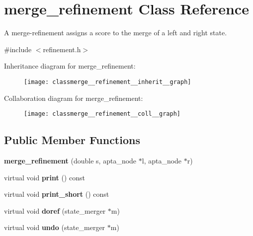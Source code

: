 \hypertarget{classmerge__refinement}{}\section{merge\+\_\+refinement Class Reference}
\label{classmerge__refinement}


A merge-\/refinement assigns a score to the merge of a left and right state.  




{\ttfamily \#include $<$refinement.\+h$>$}



Inheritance diagram for merge\+\_\+refinement\+:
\nopagebreak
\begin{figure}[H]
\begin{center}
\leavevmode
\texttt{[image: classmerge\_\_refinement\_\_inherit\_\_graph]}
\end{center}
\end{figure}


Collaboration diagram for merge\+\_\+refinement\+:
\nopagebreak
\begin{figure}[H]
\begin{center}
\leavevmode
\texttt{[image: classmerge\_\_refinement\_\_coll\_\_graph]}
\end{center}
\end{figure}
\subsection*{Public Member Functions}
\begin{DoxyCompactItemize}
\item 
{\bfseries merge\+\_\+refinement} (double s, apta\+\_\+node $\ast$l, apta\+\_\+node $\ast$r)\hypertarget{classmerge__refinement_ab15fbbafe3f8f46af3642854c8369358}{}\label{classmerge__refinement_ab15fbbafe3f8f46af3642854c8369358}

\item 
virtual void {\bfseries print} () const \hypertarget{classmerge__refinement_ab2cefa02adc51cdb87a05e9d78b0c54a}{}\label{classmerge__refinement_ab2cefa02adc51cdb87a05e9d78b0c54a}

\item 
virtual void {\bfseries print\+\_\+short} () const \hypertarget{classmerge__refinement_a0c6074a732d5656f1fd87432c7c2b1de}{}\label{classmerge__refinement_a0c6074a732d5656f1fd87432c7c2b1de}

\item 
virtual void {\bfseries doref} (state\+\_\+merger $\ast$m)\hypertarget{classmerge__refinement_ad1b3a5fe3fa980978d909debf4eaebd1}{}\label{classmerge__refinement_ad1b3a5fe3fa980978d909debf4eaebd1}

\item 
virtual void {\bfseries undo} (state\+\_\+merger $\ast$m)\hypertarget{classmerge__refinement_ae5d7dcbd7ddc8595b2d7bcf88d14ad98}{}\label{classmerge__refinement_ae5d7dcbd7ddc8595b2d7bcf88d14ad98}

\end{DoxyCompactItemize}
